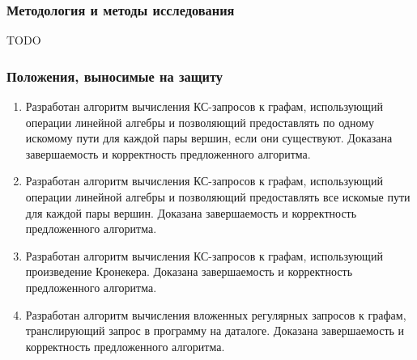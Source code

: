 \subsubsection*{\large{Методология и методы исследования}}
TODO



\subsubsection*{\large{Положения, выносимые на защиту}}
\begin{enumerate}
	\item Разработан алгоритм вычисления КС-запросов к графам, использующий операции линейной алгебры и позволяющий предоставлять по одному искомому пути для каждой пары вершин, если они существуют. Доказана завершаемость и корректность предложенного алгоритма.
	\item Разработан алгоритм вычисления КС-запросов к графам, использующий операции линейной алгебры и позволяющий предоставлять все искомые пути для каждой пары вершин. Доказана завершаемость и корректность предложенного алгоритма.
	\item Разработан алгоритм вычисления КС-запросов к графам, использующий произведение Кронекера. Доказана завершаемость и корректность предложенного алгоритма.
	\item Разработан алгоритм вычисления вложенных регулярных запросов к графам, транслирующий запрос в программу на даталоге. Доказана завершаемость и корректность предложенного алгоритма.
\end{enumerate}


